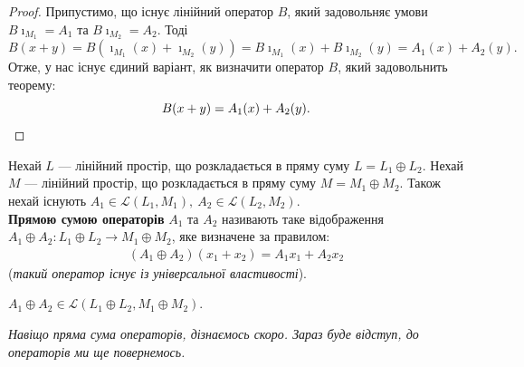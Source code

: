 \documentclass{math_library}
\begin{document}
	\begin{proof}
	Припустимо, що існує лінійний оператор $B$, який задовольняє умови $B \imath_{M_1} = A_1$ та $B \imath_{M_2} = A_2$. Тоді
	\[
	B(x+y) = B(\imath_{M_1}(x) + \imath_{M_2}(y)) = B \imath_{M_1}(x) + B\imath_{M_2}(y) = A_1(x) + A_2(y).
	\]
	Отже, у нас існує єдиний варіант, як визначити оператор $B$, який задовольнить теорему:
	\[
	B(x+y) = A_1(x) + A_2(y). \qedhere
	\]
	\end{proof}
	
	\begin{definition}
	Нехай $L$ --- лінійний простір, що розкладається в пряму суму $L = L_1 \oplus L_2$. Нехай $M$ --- лінійний простір, що розкладається в пряму суму $M = M_1 \oplus M_2$. Також нехай існують $A_1 \in \mathcal{L}(L_1,M_1),\ A_2 \in \mathcal{L}(L_2,M_2)$.\\	\textbf{Прямою сумою операторів} $A_1$ та $A_2$ називають таке відображення $A_1 \oplus A_2 \colon L_1  \oplus  L_2 \to M_1 \oplus  M_2$, яке визначене за правилом:
	\begin{align*}
	(A_1  \oplus  A_2)(x_1+x_2)=A_1x_1 + A_2x_2
	\end{align*}
	(\textit{такий оператор існує із універсальної властивості}).
	\end{definition}
	
	\begin{remark}
	$A_1 \oplus A_2 \in \mathcal{L}(L_1 \oplus L_2, M_1 \oplus M_2)$.
	\end{remark}
	

	\noindent
	\textit{Навіщо пряма сума операторів, дізнаємось скоро. Зараз буде відступ, до операторів ми ще повернемось.} 
	\newpage
	
\end{document}
